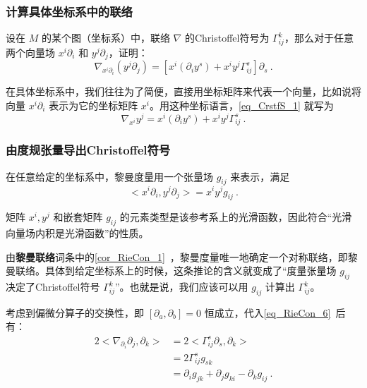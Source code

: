 \subsubsection{计算具体坐标系中的联络}

\begin{exercise}{}
设在 $M$ 的某个图（坐标系）中，联络 $\nabla$ 的Christoffel符号为 $\Gamma^k_{ij}$，那么对于任意两个向量场 $x^i\partial_i$ 和 $y^j\partial_j$，证明：
\begin{equation}\label{eq_CrstfS_1}
\nabla_{x^i\partial_i}(y^j\partial_j)=[x^i(\partial_iy^s)+x^iy^j\Gamma^s_{ij}]\partial_s~.
\end{equation}
\end{exercise}

在具体坐标系中，我们往往为了简便，直接用坐标矩阵来代表一个向量，比如说将向量 $x^i\partial_i$ 表示为它的坐标矩阵 $x^i$。用这种坐标语言，\autoref{eq_CrstfS_1} 就写为
\begin{equation}\label{eq_CrstfS_4}
\nabla_{x^i}y^j=x^i(\partial_iy^s)+x^iy^j\Gamma^s_{ij}~.
\end{equation}

\subsubsection{由度规张量导出Christoffel符号}

在任意给定的坐标系中，黎曼度量用一个张量场 $g_{ij}$ 来表示，满足
\begin{equation}
<x^i\partial_i, y^j\partial_j>=x^iy^jg_{ij}~.
\end{equation}

矩阵 $x^i, y^j$ 和嵌套矩阵 $g_{ij}$ 的元素类型是该参考系上的光滑函数，因此符合“光滑向量场内积是光滑函数”的性质。

由\textbf{黎曼联络}词条中的\autoref{cor_RieCon_1}~，黎曼度量唯一地确定一个对称联络，即黎曼联络。具体到给定坐标系上的时候，这条推论的含义就变成了“度量张量场 $g_{ij}$ 决定了Christoffel符号 $\Gamma^k_{ij}$”。也就是说，我们应该可以用 $g_{ij}$ 计算出 $\Gamma^k_{ij}$。

考虑到偏微分算子的交换性，即 $[\partial_a, \partial_b]=0$ 恒成立，代入\autoref{eq_RieCon_6}~后有：
\begin{equation}\label{eq_CrstfS_2}
\begin{aligned}
2<\nabla_{\partial_i}\partial_j, \partial_k>&=2<\Gamma^s_{ij}\partial_s, \partial_k>\\
&=2\Gamma^s_{ij}g_{sk}\\
&=\partial_ig_{jk}+\partial_jg_{ki}-\partial_kg_{ij}~.
\end{aligned}
\end{equation}

